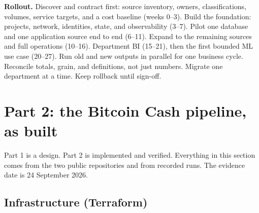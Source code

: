 \documentclass[10pt,a4paper]{article}
\begin{document}
\textbf{Rollout.} Discover and contract first: source inventory, owners,
classifications, volumes, service targets, and a cost baseline (weeks
0--3). Build the foundation: projects, network, identities, state, and
observability (3--7). Pilot one database and one application source end
to end (6--11). Expand to the remaining sources and full operations
(10--16). Department BI (15--21), then the first bounded ML use case
(20--27). Run old and new outputs in parallel for one business cycle.
Reconcile totals, grain, and definitions, not just numbers. Migrate one
department at a time. Keep rollback until sign-off.

\clearpage
\section{Part 2: the Bitcoin Cash pipeline, as built}
\label{sec:part2}

Part 1 is a design. Part 2 is implemented and verified. Everything in
this section comes from the two public repositories and from recorded
runs.\cite{repoInfra,repoDBT} The evidence date is 24 September 2026.

\subsection{Infrastructure (Terraform)}
\end{document}
